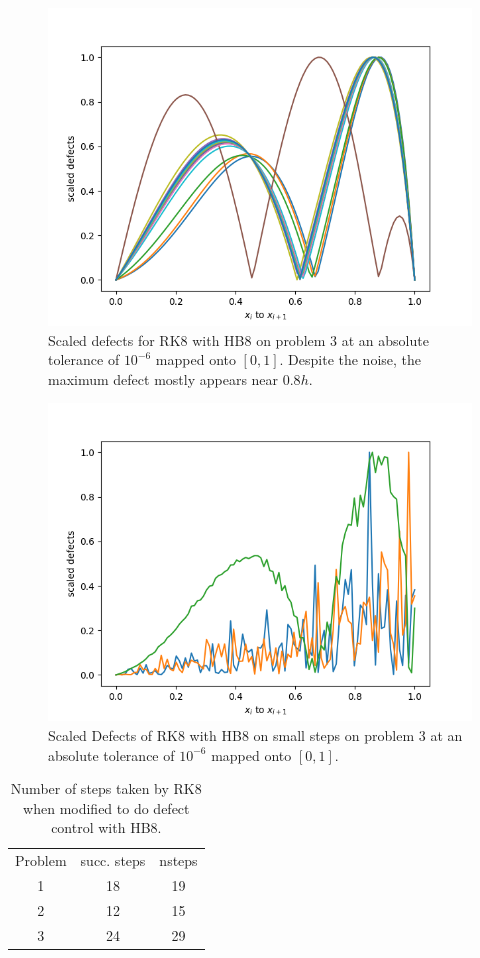 \begin{figure}[H]
\centering
\includegraphics[width=0.7\linewidth]{./figures/rk8_with_hb8_p3_scaled_defects}
\caption{Scaled defects for RK8 with HB8 on problem 3 at an absolute tolerance of $10^{-6}$  mapped onto $[0, 1]$. Despite the noise, the maximum defect mostly appears near $0.8h$.}
\label{fig:rk8_with_hb8_p3_scaled_defects}
\end{figure}

\begin{figure}[H]
\centering
\includegraphics[width=0.7\linewidth]{./figures/rk8_with_hb8_p3_scaled_defects_small_steps}
\caption{Scaled Defects of RK8 with HB8 on small steps on problem 3 at an absolute tolerance of $10^{-6}$ mapped onto $[0, 1]$.}
\label{fig:rk8_with_hb8_p3_scaled_defects_small_steps}
\end{figure}

\begin{table}[h]
\caption {Number of steps taken by RK8 when modified to do defect control with HB8.} \label{tab:rk8_with_hb8_nsteps}
\begin{center}
\begin{tabular}{ c c c } 
Problem & succ. steps & nsteps \\ 
1       & 18             &        19 \\ 
2       & 12             &        15 \\
3       & 24             &        29 \\
\end{tabular}
\end{center}
\end{table}

